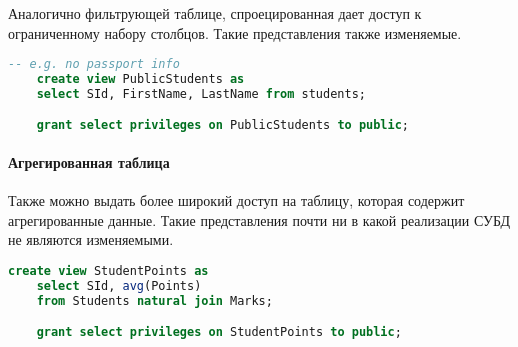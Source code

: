 Аналогично фильтрующей таблице, спроецированная дает доступ к ограниченному набору столбцов. Такие
представления также изменяемые.

\begin{example}
	\enewline
	\begin{lstlisting}[language=SQL]
    -- e.g. no passport info
    create view PublicStudents as
    select SId, FirstName, LastName from students;

    grant select privileges on PublicStudents to public;
    \end{lstlisting}
\end{example}

\paragraph{Агрегированная таблица}

Также можно выдать более широкий доступ на таблицу, которая содержит агрегированные данные. Такие
представления почти ни в какой реализации СУБД не являются изменяемыми.

\begin{example}
	\enewline
	\begin{lstlisting}[language=SQL]
    create view StudentPoints as
    select SId, avg(Points)
    from Students natural join Marks;

    grant select privileges on StudentPoints to public;
    \end{lstlisting}
\end{example}
